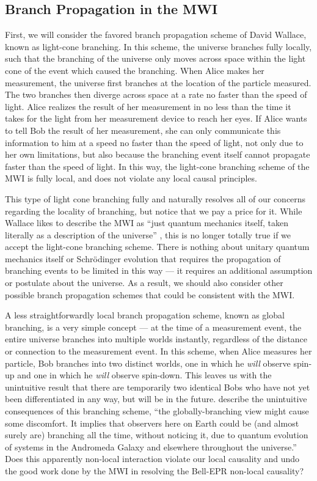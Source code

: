 \subsection{Branch Propagation in the MWI}

First, we will consider the favored branch propagation scheme of David Wallace,
known as light-cone branching. In this scheme, the universe branches fully
locally, such that the branching of the universe only moves across space within
the light cone of the event which caused the branching. When Alice makes her
measurement, the universe first branches at the location of the particle
measured. The two branches then diverge across space at a rate no faster than
the speed of light. Alice realizes the result of her measurement in no less than
the time it takes for the light from her measurement device to reach her eyes. 
If Alice wants to tell Bob the result of her measurement, she can only
communicate this information to him at a speed no faster than the speed of
light, not only due to her own limitations, but also because the branching
event itself cannot propagate faster than the speed of light. In this way, the
light-cone branching scheme of the MWI is fully local, and does not violate any
local causal principles.

This type of light cone branching fully and naturally resolves all of our
concerns regarding the locality of branching, but notice that we pay a price for
it. While Wallace likes to describe the MWI as ``just quantum mechanics itself,
taken literally as a description of the universe'' \citep{Wallace_2012}, this
is no longer totally true if we accept the light-cone branching scheme. There is
nothing about unitary quantum mechanics itself or Schrödinger evolution that
requires the propagation of branching events to be limited in this way — it 
requires an additional assumption or postulate about the universe. As a result,
we should also consider other possible branch propagation schemes that could be
consistent with the MWI.

A less straightforwardly local branch propagation scheme, known as global
branching, is a very simple concept — at the time of a measurement event, the
entire universe branches into multiple worlds instantly, regardless of the
distance or connection to the measurement event. In this scheme, when Alice
measures her particle, Bob branches into two distinct worlds, one in which he 
\emph{will} observe spin-up and one in which he \emph{will} observe spin-down.
This leaves us with the unintuitive result that there are temporarily two
identical Bobs who have not yet been differentiated in any way, but will be in 
the future. \cite{Sebens_2018} describe the unintuitive consequences of this
branching scheme, ``the globally-branching view might cause some discomfort. It
implies that observers here on Earth could be (and almost surely are) branching
all the time, without noticing it, due to quantum evolution of systems in the 
Andromeda Galaxy and elsewhere throughout the universe.'' Does this apparently
non-local interaction violate our local causality and undo the good work done by
the MWI in resolving the Bell-EPR non-local causality?


